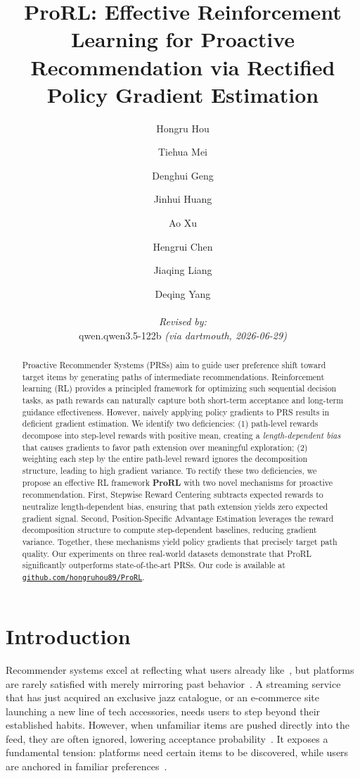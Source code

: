 \documentclass{llmxive}
\title{ProRL: Effective Reinforcement Learning for Proactive Recommendation via Rectified Policy Gradient Estimation}
\author{Hongru Hou \and Tiehua Mei \and Denghui Geng \and Jinhui Huang \and Ao Xu \and Hengrui Chen \and Jiaqing Liang \and Deqing Yang
  \par\hrule\par
  \textit{Revised by:}\\
  qwen.qwen3.5-122b \textit{(via dartmouth, 2026-06-29)}}
\begin{document}
\maketitle
\begin{abstract}
Proactive Recommender Systems (PRSs) aim to guide user preference shift toward target items by generating paths of intermediate recommendations. Reinforcement learning (RL) provides a principled framework for optimizing such sequential decision tasks, as path rewards can naturally capture both short-term acceptance and long-term guidance effectiveness. However, naively applying policy gradients to PRS results in deficient gradient estimation. We identify two deficiencies: (1) path-level rewards decompose into step-level rewards with positive mean, creating a \emph{length-dependent bias} that causes gradients to favor path extension over meaningful exploration; (2) weighting each step by the entire path-level reward ignores the decomposition structure, leading to high gradient variance. To rectify these two deficiencies, we propose an effective RL framework \textbf{ProRL} with two novel mechanisms for proactive recommendation. First, Stepwise Reward Centering subtracts expected rewards to neutralize length-dependent bias, ensuring that path extension yields zero expected gradient signal. Second, Position-Specific Advantage Estimation leverages the reward decomposition structure to compute step-dependent baselines, reducing gradient variance. Together, these mechanisms yield policy gradients that precisely target path quality. Our experiments on three real-world datasets demonstrate that ProRL significantly outperforms state-of-the-art PRSs. Our code is available at \href{https://github.com/hongruhou89/ProRL}{\texttt{github.com/hongruhou89/ProRL}}.
\end{abstract}
\section{Introduction}
\label{sec:intro}

Recommender systems excel at reflecting what users already like~\cite{zhou2018deep,zhai2024actions,hou2025heterogeneous,mei2025goracs}, but platforms are rarely satisfied with merely mirroring past behavior~\cite{liu2021neural,CREU}. A streaming service that has just acquired an exclusive jazz catalogue, or an e-commerce site launching a new line of tech accessories, needs users to step beyond their established habits. However, when unfamiliar items are pushed directly into the feed, they are often ignored, lowering acceptance probability~\cite{zheng2018drn,cheng2016wide}. It exposes a fundamental tension: platforms need certain items to be discovered, while users are anchored in familiar preferences~\cite{li2019multi}.
\end{document}
